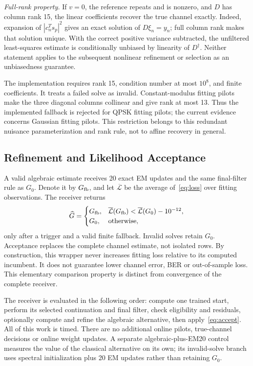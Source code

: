 \textit{Full-rank property.} If $v=0$, the reference repeats and is nonzero, and $D$ has column rank 15, the linear coefficients recover the true channel exactly. Indeed, expansion of $|c_n^Ts_p|^2$ gives an exact solution of $D\xi_n=y_n$; full column rank makes that solution unique. With the correct positive variance subtracted, the unfiltered least-squares estimate is conditionally unbiased by linearity of $D^\dagger$. Neither statement applies to the subsequent nonlinear refinement or selection as an unbiasedness guarantee.

The implementation requires rank 15, condition number at most $10^8$, and finite coefficients. It treats a failed solve as invalid. Constant-modulus fitting pilots make the three diagonal columns collinear and give rank at most 13. Thus the implemented fallback is rejected for QPSK fitting pilots; the current evidence concerns Gaussian fitting pilots. This restriction belongs to this redundant nuisance parameterization and rank rule, not to affine recovery in general.

\subsection{Refinement and Likelihood Acceptance}
A valid algebraic estimate receives 20 exact EM updates and the same final-filter rule as $G_0$. Denote it by $G_{\rm fb}$, and let $\overline{\mathcal L}$ be the average of~\eqref{eq:loss} over fitting observations. The receiver returns
\begin{equation}
 \widehat G=\begin{cases}
 G_{\rm fb},&\overline{\mathcal L}(G_{\rm fb})<
 \overline{\mathcal L}(G_0)-10^{-12},\\
 G_0,&\text{otherwise},
 \end{cases}
 \label{eq:accept}
\end{equation}
only after a trigger and a valid finite fallback. Invalid solves retain $G_0$. Acceptance replaces the complete channel estimate, not isolated rows. By construction, this wrapper never increases fitting loss relative to its computed incumbent. It does not guarantee lower channel error, BER or out-of-sample loss. This elementary comparison property is distinct from convergence of the complete receiver.

The receiver is evaluated in the following order: compute one trained start, perform its selected continuation and final filter, check eligibility and residuals, optionally compute and refine the algebraic alternative, then apply~\eqref{eq:accept}. All of this work is timed. There are no additional online pilots, true-channel decisions or online weight updates. A separate algebraic-plus-EM20 control measures the value of the classical alternative on its own; its invalid-solve branch uses spectral initialization plus 20 EM updates rather than retaining $G_0$.
